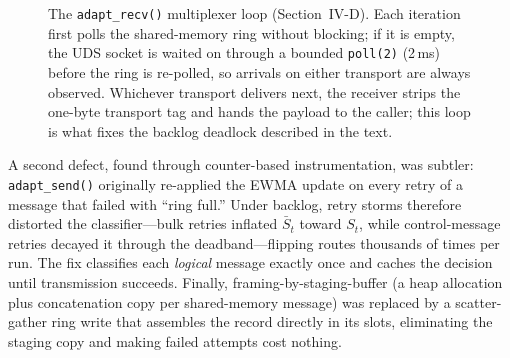 \documentclass[conference]{IEEEtran}
\newcommand{\sbar}{\bar{S}}
\begin{document}
\begin{figure}[t]
\centering
{}
\caption{The \texttt{adapt\_recv()} multiplexer loop
(Section~IV-D). Each iteration first polls the shared-memory ring without
blocking; if it is empty, the UDS socket is waited on through a bounded
\texttt{poll(2)} (2\,ms) before the ring is re-polled, so arrivals on
either transport are always observed. Whichever transport delivers next,
the receiver strips the one-byte transport tag and hands the payload to
the caller; this loop is what fixes the backlog deadlock described in the
text.}
\label{fig:mux}
\end{figure}



A second defect, found through counter-based instrumentation, was subtler:
\texttt{adapt\_send()} originally re-applied the EWMA update on every
retry of a message that failed with ``ring full.'' Under backlog, retry
storms therefore distorted the classifier---bulk retries inflated
$\sbar_t$ toward $S_t$, while control-message retries decayed it through
the deadband---flipping routes thousands of times per run. The fix classifies
each \emph{logical} message exactly once and caches the decision until
transmission succeeds. Finally, framing-by-staging-buffer (a heap allocation
plus concatenation copy per shared-memory message) was replaced by a
scatter-gather ring write that assembles the record directly in its slots,
eliminating the staging copy and making failed attempts cost nothing.
\end{document}
